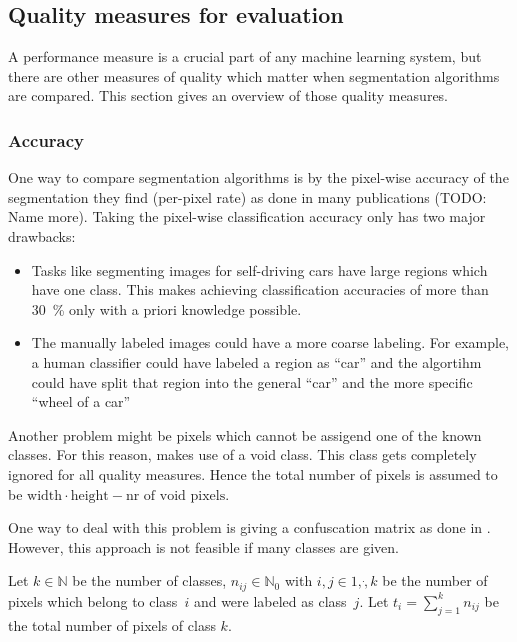 \subsection{Quality measures for evaluation}\label{subsec:quality-measures}

A performance measure is a crucial part of any machine learning system, but
there are other measures of quality which matter when segmentation algorithms
are compared. This section gives an overview of those quality measures.


\subsubsection{Accuracy}
One way to compare segmentation algorithms is by the pixel-wise accuracy of the
segmentation they find (per-pixel rate) as done in many publications
\cite{shotton2006textonboost} (TODO: Name more). Taking the pixel-wise
classification accuracy only has two major drawbacks:

\begin{itemize}
    \item Tasks like segmenting images for self-driving cars have large regions
          which have one class. This makes achieving classification accuracies
          of more than \SI{30}{\percent} only with a priori knowledge possible.
    \item The manually labeled images could have a more coarse labeling. For
          example, a human classifier could have labeled a region as
          \enquote{car} and the algortihm could have split that region into
          the general \enquote{car} and the more specific \enquote{wheel of a
          car}
\end{itemize}

Another problem might be pixels which cannot be assigend one of the known
classes. For this reason, \cite{shotton2006textonboost} makes use of a void
class. This class gets completely ignored for all quality measures. Hence the
total number of pixels is assumed to be $\text{width} \cdot \text{height} - \text{nr of void pixels}$.

One way to deal with this problem is giving a confuscation matrix as done in
\cite{shotton2006textonboost}. However, this approach is not feasible if many
classes are given.

Let $k \in \mathbb{N}$ be the number of classes, $n_{ij} \in \mathbb{N}_0$ with
$i,j \in 1, \dot, k$ be the number of pixels which belong to class~$i$ and were
labeled as class~$j$. Let $t_i = \sum_{j=1}^k n_{ij}$ be the total number of
pixels of class $k$.

